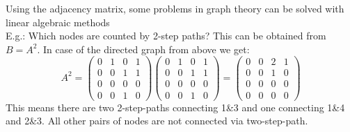 \noindent Using the adjacency matrix, some problems in graph theory can be solved with linear algebraic methods\\
E.g.: Which nodes are counted by 2-step paths? This can be obtained from $B=A^2$. In case of the directed graph from above we get:
\begin{equation*}
A^2=\begin{pmatrix} 0 & 1 & 0 & 1 \\ 0 & 0 & 1 & 1 \\ 0 & 0 & 0 & 0 \\ 0 & 0 & 1 & 0 \end{pmatrix}\begin{pmatrix} 0 & 1 & 0 & 1 \\ 0 & 0 & 1 & 1 \\ 0 & 0 & 0 & 0 \\ 0 & 0 & 1 & 0 \end{pmatrix}=\begin{pmatrix} 0 & 0 & 2 & 1 \\ 0 & 0 & 1 & 0 \\ 0 & 0 & 0 & 0 \\ 0 & 0 & 0 & 0 \end{pmatrix}
\end{equation*}
This means there are two 2-step-paths connecting 1\&{}3 and one connecting 1\&{}4 and 2\&{}3. All other pairs of nodes are not connected via two-step-path.
